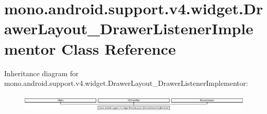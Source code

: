 \hypertarget{classmono_1_1android_1_1support_1_1v4_1_1widget_1_1_drawer_layout___drawer_listener_implementor}{}\section{mono.\+android.\+support.\+v4.\+widget.\+Drawer\+Layout\+\_\+\+Drawer\+Listener\+Implementor Class Reference}
\label{classmono_1_1android_1_1support_1_1v4_1_1widget_1_1_drawer_layout___drawer_listener_implementor}
Inheritance diagram for mono.\+android.\+support.\+v4.\+widget.\+Drawer\+Layout\+\_\+\+Drawer\+Listener\+Implementor\+:\begin{figure}[H]
\begin{center}
\leavevmode
\includegraphics[height=0.837070cm]{classmono_1_1android_1_1support_1_1v4_1_1widget_1_1_drawer_layout___drawer_listener_implementor}
\end{center}
\end{figure}
